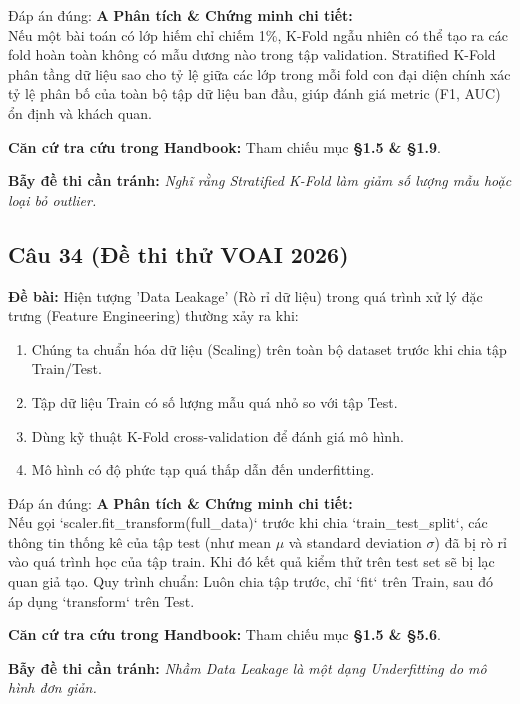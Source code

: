 \documentclass[10pt,a4paper]{article}
\begin{document}
\begin{solbox}{Đáp án đúng: \textbf{A}}
\textbf{Phân tích \& Chứng minh chi tiết:} \\
Nếu một bài toán có lớp hiếm chỉ chiếm 1\%, K-Fold ngẫu nhiên có thể tạo ra các fold hoàn toàn không có mẫu dương nào trong tập validation. Stratified K-Fold phân tầng dữ liệu sao cho tỷ lệ giữa các lớp trong mỗi fold con đại diện chính xác tỷ lệ phân bố của toàn bộ tập dữ liệu ban đầu, giúp đánh giá metric (F1, AUC) ổn định và khách quan.

\vspace{0.4em}
\textbf{Căn cứ tra cứu trong Handbook:} Tham chiếu mục \textbf{§1.5 \& §1.9}.

\vspace{0.4em}
\textbf{Bẫy đề thi cần tránh:} \textit{Nghĩ rằng Stratified K-Fold làm giảm số lượng mẫu hoặc loại bỏ outlier.}
\end{solbox}
\vspace{0.5em}


\subsection*{Câu 34 (Đề thi thử VOAI 2026)}
\textbf{Đề bài:} Hiện tượng 'Data Leakage' (Rò rỉ dữ liệu) trong quá trình xử lý đặc trưng (Feature Engineering) thường xảy ra khi:

\begin{enumerate}[label=\textbf{\Alph*.}]
    \item Chúng ta chuẩn hóa dữ liệu (Scaling) trên toàn bộ dataset trước khi chia tập Train/Test.
    \item Tập dữ liệu Train có số lượng mẫu quá nhỏ so với tập Test.
    \item Dùng kỹ thuật K-Fold cross-validation để đánh giá mô hình.
    \item Mô hình có độ phức tạp quá thấp dẫn đến underfitting.
\end{enumerate}

\begin{solbox}{Đáp án đúng: \textbf{A}}
\textbf{Phân tích \& Chứng minh chi tiết:} \\
Nếu gọi `scaler.fit\_transform(full\_data)` trước khi chia `train\_test\_split`, các thông tin thống kê của tập test (như mean $\mu$ và standard deviation $\sigma$) đã bị rò rỉ vào quá trình học của tập train. Khi đó kết quả kiểm thử trên test set sẽ bị lạc quan giả tạo. Quy trình chuẩn: Luôn chia tập trước, chỉ `fit` trên Train, sau đó áp dụng `transform` trên Test.

\vspace{0.4em}
\textbf{Căn cứ tra cứu trong Handbook:} Tham chiếu mục \textbf{§1.5 \& §5.6}.

\vspace{0.4em}
\textbf{Bẫy đề thi cần tránh:} \textit{Nhầm Data Leakage là một dạng Underfitting do mô hình đơn giản.}
\end{solbox}
\vspace{0.5em}
\end{document}
